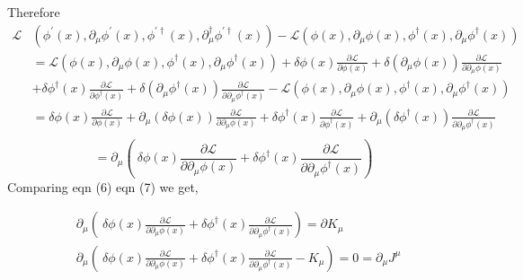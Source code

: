 \documentclass[12pt, letterpaper]{article}
\newcommand*{\1}{\hspace{1pt}}
\begin{document}
Therefore 
\begin{align*}
    \mathcal{L} &(\phi ^{\prime} (x), \partial _{\mu} \phi ^{\prime} (x), \phi ^{\prime \dagger} (x), \partial ^{\dagger} _{\mu}  \phi ^{\prime \dagger} (x)) -  \mathcal{L} (\phi (x), \partial _{\mu} \phi  (x), \phi ^{ \dagger} (x), \partial _{\mu}  \phi ^{\dagger} (x)) \\
    &= \mathcal{L} (\phi (x), \partial _{\mu} \phi  (x), \phi ^{ \dagger} (x), \partial _{\mu}  \phi ^{\dagger} (x)) + \delta \phi (x) \frac{\partial \mathcal{L}}{\partial \phi (x)} + \delta(\partial _{\mu} \phi (x)) \frac{\partial \mathcal{L}}{\partial \partial _{\mu} \phi (x)} \\ &+ \delta \phi ^{\dagger} (x) \frac{\partial \mathcal{L}}{\partial \phi ^{\dagger} (x)} + \delta(\partial _{\mu} \phi ^{\dagger} (x)) \frac{\partial \mathcal{L}}{\partial \partial _{\mu} \phi ^{\dagger} (x)} -\mathcal{L} (\phi (x), \partial _{\mu} \phi  (x), \phi ^{ \dagger} (x), \partial _{\mu}  \phi ^{\dagger} (x)) \\ 
    &= \delta \phi (x) \frac{\partial \mathcal{L}}{\partial \phi (x)} + \partial _{\mu} (\delta \phi (x)) \frac{\partial \mathcal{L}}{\partial \partial _{\mu} \phi (x)} + \delta \phi ^{\dagger} (x) \frac{\partial \mathcal{L}}{\partial \phi ^{\dagger} (x)} + \partial _{\mu} (\delta \phi ^{\dagger} (x)) \frac{\partial \mathcal{L}}{\partial \partial _{\mu} \phi ^{\dagger} (x)} \\
\end{align*}
\begin{equation}
    = \partial _{\mu} \left(\ \delta \phi (x) \frac{\partial \mathcal{L}}{\partial \partial _{\mu} \phi (x)} + \delta \phi ^{\dagger} (x) \frac{\partial \mathcal{L}}{\partial \partial _{\mu} \phi ^{\dagger} (x)} \right)
\end{equation}
Comparing eqn (6) eqn (7) we get, 

\begin{align}
    &\partial _{\mu} \left(\ \delta \phi (x) \frac{\partial \mathcal{L}}{\partial \partial _{\mu} \phi (x)} + \delta \phi ^{\dagger} (x) \frac{\partial \mathcal{L}}{\partial \partial _{\mu} \phi ^{\dagger} (x)} \right) = \partial K_{\mu} \\
    & \partial _{\mu} \left(\ \delta \phi (x) \frac{\partial \mathcal{L}}{\partial \partial _{\mu} \phi (x)} + \delta \phi ^{\dagger} (x) \frac{\partial \mathcal{L}}{\partial  \partial _{\mu} \phi ^{\dagger} (x)} - K_{\mu} \right) = 0 = \partial _{\mu} J^{\mu}
\end{align}
\end{document}
